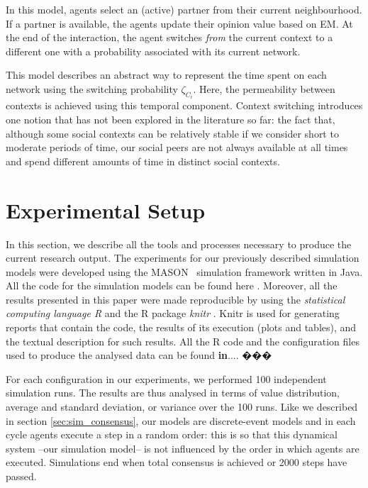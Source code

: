 \documentclass[preprint,number]{elsarticle}
\begin{document}
	\noindent In this model, agents select an (active) partner from their current neighbourhood. If a partner is available, the agents update their opinion value based on EM. At the end of the interaction, the agent switches \textit{from} the current context to a different one with a probability associated with its current network. 
	
	This model describes an abstract way to represent the time spent on each network using the switching probability $\zeta_{C_i}$. Here, the permeability between contexts is achieved using this temporal component. Context switching introduces one notion that has not been explored in the literature so far: the fact that, although some social contexts can be relatively stable if we consider short to moderate periods of time, our social peers are not always available at all times and spend different amounts of time in distinct social contexts.
	
	\section{Experimental Setup}
	\label{sec:experimental-setup}
	In this section, we describe all the tools and processes necessary to produce the current research output. The experiments for our previously described simulation models were developed using the MASON~\cite{Luke2005} simulation framework written in Java. All the code for the simulation models can be found here \cite{Nunes:Software:11067}. Moreover, all the results presented in this paper were made reproducible by using the \textit{statistical computing language R} \cite{R2008} and the R package \textit{knitr} \cite{knitr2014}. Knitr is used for generating reports that contain the code, the results of its execution (plots and tables), and the textual description for such results. All the R code and the configuration files used to produce the analysed data can be found \textbf{in}.... ���

For each configuration in our experiments, we performed 100 independent simulation runs. The results are thus analysed in terms of value distribution, average and standard deviation, or variance over the 100 runs. Like we described in section \ref{sec:sim_consensus}, our models are discrete-event models and in each cycle agents execute 
a step in a random order: this is so that this dynamical system --our simulation model-- is not influenced by the order in which agents are executed. Simulations end when total consensus is achieved or 2000 steps have passed.  
\end{document}
